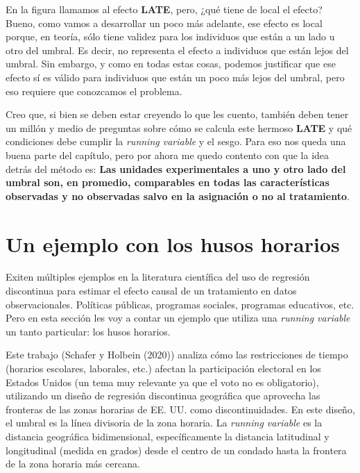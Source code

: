 \documentclass[
  letterpaper,
  DIV=11,
  numbers=noendperiod,
  oneside]{scrreprt}
\begin{document}
En la figura llamamos al efecto \textbf{LATE}, pero, ¿qué tiene de local el
efecto? Bueno, como vamos a desarrollar un poco más adelante, ese efecto
es local porque, en teoría, sólo tiene validez para los individuos que
están a un lado u otro del umbral. Es decir, no representa el efecto a
individuos que están lejos del umbral. Sin embargo, y como en todas
estas cosas, podemos justificar que ese efecto sí es válido para
individuos que están un poco más lejos del umbral, pero eso requiere que
conozcamos el problema.

Creo que, si bien se deben estar creyendo lo que les cuento, también
deben tener un millón y medio de preguntas sobre cómo se calcula este
hermoso \textbf{LATE} y qué condiciones debe cumplir la \emph{running
variable} y el sesgo. Para eso nos queda una buena parte del capítulo,
pero por ahora me quedo contento con que la idea detrás del método es:
\textbf{Las unidades experimentales a uno y otro lado del umbral son, en
promedio, comparables en todas las características observadas y no
observadas salvo en la asignación o no al tratamiento}.

\hypertarget{un-ejemplo-con-los-husoshusos-horarios}{%
\section[Un ejemplo con los husos horarios]{\texorpdfstring{Un ejemplo
con los husos
horarios}{Un ejemplo con los husos horarios}}\label{un-ejemplo-con-los-husoshusos-horarios}}

Exiten múltiples ejemplos en la literatura científica del uso de
regresión discontinua para estimar el efecto causal de un tratamiento en
datos observacionales. Políticas públicas, programas sociales, programas
educativos, etc. Pero en esta sección les voy a contar un ejemplo que
utiliza una \emph{running variable} un tanto particular: los husos
horarios.

Este trabajo (Schafer y Holbein
(2020))
analiza cómo las restricciones de tiempo (horarios escolares, laborales,
etc.) afectan la participación electoral en los Estados Unidos (un tema
muy relevante ya que el voto no es obligatorio), utilizando un diseño de
regresión discontinua geográfica que aprovecha las fronteras de las
zonas horarias de EE. UU. como discontinuidades. En este diseño, el
umbral es la línea divisoria de la zona horaria. La \emph{running
variable} es la distancia geográfica bidimensional, específicamente la
distancia latitudinal y longitudinal (medida en grados) desde el centro
de un condado hasta la frontera de la zona horaria más cercana.
\end{document}

